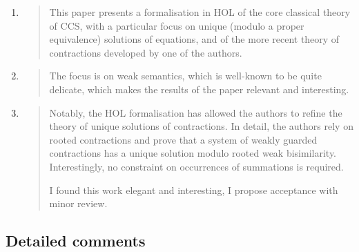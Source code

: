 \begin{enumerate}
\item \begin{quote}
    This paper presents a formalisation in HOL of the core classical
    theory of CCS, with a particular focus on unique (modulo a proper
    equivalence) solutions of equations, and of the more recent theory
    of contractions developed by one of the authors.
  \end{quote}

\item \begin{quote}
    The focus is on weak semantics, which is well-known to be quite
    delicate, which makes the results of the paper relevant and
    interesting.
  \end{quote}

\item \begin{quote}
    Notably, the HOL formalisation has allowed the authors to refine
    the theory of unique solutions of contractions. In detail, the
    authors rely on rooted contractions and prove that a system of
    weakly guarded contractions has a unique solution modulo rooted
    weak bisimilarity. Interestingly, no constraint on occurrences of
    summations is required.

    I found this work elegant and interesting, I propose acceptance with minor review.
  \end{quote}

\end{enumerate}

\subsection*{Detailed comments}

